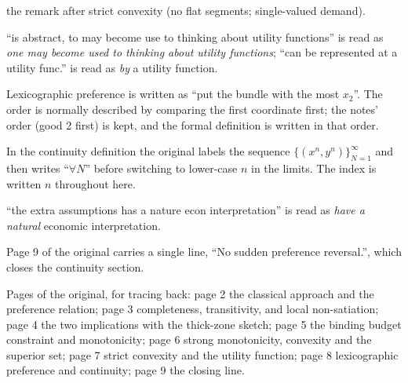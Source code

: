 \documentclass[11pt]{article}
\begin{document}
\begin{transcriptnotes}
        the remark after strict convexity (no flat segments; single-valued
        demand).
  \item ``is abstract, to may become use to thinking about utility functions'' is
        read as \emph{one may become used to thinking about utility functions};
        ``can be represented at a utility func.'' is read as \emph{by} a utility
        function.
  \item Lexicographic preference is written as ``put the bundle with the most
        $x_2$''. The order is normally described by comparing the first
        coordinate first; the notes' order (good 2 first) is kept, and the formal
        definition is written in that order.
  \item In the continuity definition the original labels the sequence
        $\{(x^n,y^n)\}_{N=1}^{\infty}$ and then writes ``$\forall N$'' before
        switching to lower-case $n$ in the limits. The index is written $n$
        throughout here.
  \item ``the extra assumptions has a nature econ interpretation'' is read as
        \emph{have a natural} economic interpretation.
  \item Page 9 of the original carries a single line, ``No sudden preference
        reversal.'', which closes the continuity section.
  \item Pages of the original, for tracing back: page 2 the classical approach
        and the preference relation; page 3 completeness, transitivity, and local
        non-satiation; page 4 the two implications with the thick-zone sketch;
        page 5 the binding budget constraint and monotonicity; page 6 strong
        monotonicity, convexity and the superior set; page 7 strict convexity and
        the utility function; page 8 lexicographic preference and continuity;
        page 9 the closing line.
\end{transcriptnotes}
\end{document}
